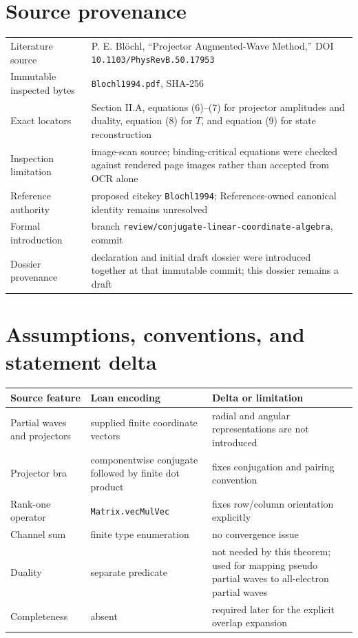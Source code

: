 \section{Source provenance}
\begin{tabularx}{\textwidth}{@{}lY@{}}
\toprule
Literature source & P. E. Bl\"ochl, ``Projector Augmented-Wave Method,'' DOI \texttt{10.1103/PhysRevB.50.17953} \\
Immutable inspected bytes & \texttt{Blochl1994.pdf}, SHA-256  \\
Exact locators & Section II.A, equations (6)--(7) for projector amplitudes and duality, equation (8) for $T$, and equation (9) for state reconstruction \\
Inspection limitation & image-scan source; binding-critical equations were checked against rendered page images rather than accepted from OCR alone \\
Reference authority & proposed citekey \texttt{Blochl1994}; References-owned canonical identity remains unresolved \\
Formal introduction & branch \texttt{review/conjugate-linear-coordinate-algebra}, commit  \\
Dossier provenance & declaration and initial draft dossier were introduced together at that immutable commit; this dossier remains a draft \\
\bottomrule
\end{tabularx}

\section{Assumptions, conventions, and statement delta}
\begin{tabularx}{\textwidth}{@{}YYY@{}}
\toprule
Source feature & Lean encoding & Delta or limitation \\
\midrule
Partial waves and projectors & supplied finite coordinate vectors & radial and angular representations are not introduced \\
Projector bra & componentwise conjugate followed by finite dot product & fixes conjugation and pairing convention \\
Rank-one operator & \texttt{Matrix.vecMulVec} & fixes row/column orientation explicitly \\
Channel sum & finite type enumeration & no convergence issue \\
Duality & separate predicate & not needed by this theorem; used for mapping pseudo partial waves to all-electron partial waves \\
Completeness & absent & required later for the explicit overlap expansion \\
\bottomrule
\end{tabularx}

